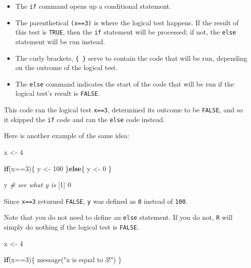 \documentclass[
]{book}
\newenvironment{Shaded}{\begin{snugshade}}{\end{snugshade}}
\newcommand{\CommentTok}[1]{\textcolor[rgb]{0.56,0.35,0.01}{\textit{#1}}}
\newcommand{\ControlFlowTok}[1]{\textcolor[rgb]{0.13,0.29,0.53}{\textbf{#1}}}
\newcommand{\DecValTok}[1]{\textcolor[rgb]{0.00,0.00,0.81}{#1}}
\newcommand{\FunctionTok}[1]{\textcolor[rgb]{0.00,0.00,0.00}{#1}}
\newcommand{\NormalTok}[1]{#1}
\newcommand{\OtherTok}[1]{\textcolor[rgb]{0.56,0.35,0.01}{#1}}
\newcommand{\SpecialCharTok}[1]{\textcolor[rgb]{0.00,0.00,0.00}{#1}}
\newcommand{\StringTok}[1]{\textcolor[rgb]{0.31,0.60,0.02}{#1}}
\providecommand{\tightlist}{%
  \setlength{\itemsep}{0pt}\setlength{\parskip}{0pt}}
\begin{document}
\begin{itemize}
\tightlist
\item
  The \texttt{if} command opens up a conditional statement.
\item
  The parenthetical \texttt{(x==3)} is where the logical test happens. If the result of this test is \texttt{TRUE}, then the \texttt{if} statement will be processed; if not, the \texttt{else} statement will be run instead.
\item
  The curly brackets, \texttt{\{\ \}} serve to contain the code that will be run, depending on the outcome of the logical test.
\item
  The \texttt{else} command indicates the start of the code that will be run if the logical test's result is \texttt{FALSE}.
\end{itemize}

This code ran the logical test \texttt{x==3}, determined its outcome to be \texttt{FALSE}, and so it skipped the \texttt{if} code and ran the \texttt{else} code instead.

Here is another example of the same idea:

\begin{Shaded}
\begin{Highlighting}[]
\NormalTok{x }\OtherTok{\textless{}{-}} \DecValTok{4}

\ControlFlowTok{if}\NormalTok{(x}\SpecialCharTok{==}\DecValTok{3}\NormalTok{)\{}
\NormalTok{  y }\OtherTok{\textless{}{-}} \DecValTok{100}
\NormalTok{\}}\ControlFlowTok{else}\NormalTok{\{}
\NormalTok{  y }\OtherTok{\textless{}{-}} \DecValTok{0}
\NormalTok{\}}

\NormalTok{y }\CommentTok{\# see what y is}
\NormalTok{[}\DecValTok{1}\NormalTok{] }\DecValTok{0}
\end{Highlighting}
\end{Shaded}

Since \texttt{x==3} returned \texttt{FALSE}, \texttt{y} was defined as \texttt{0} instead of \texttt{100}.

Note that you do not need to define an \texttt{else} statement. If you do not, \texttt{R} will simply do nothing if the logical test is \texttt{FALSE}.

\begin{Shaded}
\begin{Highlighting}[]
\NormalTok{x }\OtherTok{\textless{}{-}} \DecValTok{4}

\ControlFlowTok{if}\NormalTok{(x}\SpecialCharTok{==}\DecValTok{3}\NormalTok{)\{}
  \FunctionTok{message}\NormalTok{(}\StringTok{"x is equal to 3!"}\NormalTok{)}
\NormalTok{\}}
\end{Highlighting}
\end{Shaded}
\end{document}
